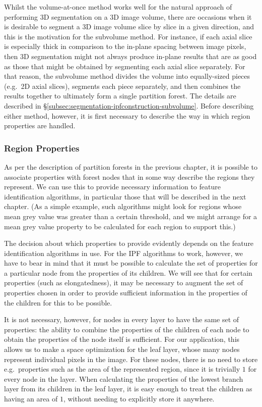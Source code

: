 Whilst the volume-at-once method works well for the natural approach of performing 3D segmentation on a 3D image volume, there are occasions when it is desirable to segment a 3D image volume slice by slice in a given direction, and this is the motivation for the subvolume method. For instance, if each axial slice is especially thick in comparison to the in-plane spacing between image pixels, then 3D segmentation might not always produce in-plane results that are as good as those that might be obtained by segmenting each axial slice separately. For that reason, the subvolume method divides the volume into equally-sized pieces (e.g.~2D axial slices), segments each piece separately, and then combines the results together to ultimately form a single partition forest. The details are described in \S\ref{subsec:segmentation-ipfconstruction-subvolume}. Before describing either method, however, it is first necessary to describe the way in which region properties are handled.

\subsubsection{Region Properties}

As per the description of partition forests in the previous chapter, it is possible to associate properties with forest nodes that in some way describe the regions they represent. We can use this to provide necessary information to feature identification algorithms, in particular those that will be described in the next chapter. (As a simple example, such algorithms might look for regions whose mean grey value was greater than a certain threshold, and we might arrange for a mean grey value property to be calculated for each region to support this.)

The decision about which properties to provide evidently depends on the feature identification algorithms in use. For the IPF algorithms to work, however, we have to bear in mind that it must be possible to calculate the set of properties for a particular node from the properties of its children. We will see that for certain properties (such as elongatedness), it may be necessary to augment the set of properties chosen in order to provide sufficient information in the properties of the children for this to be possible.

It is not necessary, however, for nodes in every layer to have the same set of properties: the ability to combine the properties of the children of each node to obtain the properties of the node itself is sufficient. For our application, this allows us to make a space optimization for the leaf layer, whose many nodes represent individual pixels in the image. For these nodes, there is no need to store e.g.~properties such as the area of the represented region, since it is trivially $1$ for every node in the layer. When calculating the properties of the lowest branch layer from its children in the leaf layer, it is easy enough to treat the children as having an area of $1$, without needing to explicitly store it anywhere.

